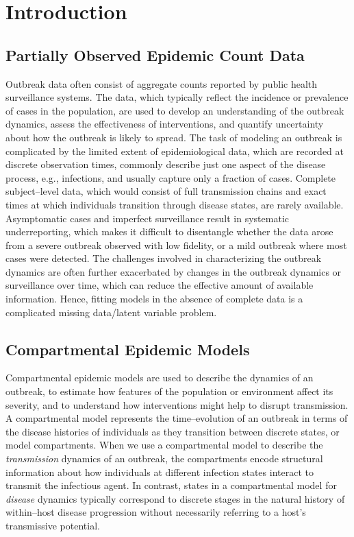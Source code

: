 \chapter{Introduction}
\label{chap:introduction}

\section{Partially Observed Epidemic Count Data}
\label{sec:data_background}

Outbreak data often consist of aggregate counts reported by public health surveillance systems. The data, which typically reflect the incidence or prevalence of cases in the population, are used to develop an understanding of the outbreak dynamics, assess the effectiveness of interventions, and quantify uncertainty about how the outbreak is likely to spread. 
The task of modeling an outbreak is complicated by the limited extent of epidemiological data, which are recorded at discrete observation times, commonly describe just one aspect of the disease process, e.g., infections, and usually capture only a fraction of cases. Complete subject--level data, which would consist of full transmission chains and exact times at which individuals transition through disease states, are rarely available. Asymptomatic cases and imperfect surveillance result in systematic underreporting, which makes it difficult to disentangle whether the data arose from a severe outbreak observed with low fidelity, or a mild outbreak where most cases were detected. The challenges involved in characterizing the outbreak dynamics are often further exacerbated by changes in the outbreak dynamics or surveillance over time, which can reduce the effective amount of available information. Hence, fitting models in the absence of complete data is a complicated missing data/latent variable problem. 

\section{Compartmental Epidemic Models}
\label{sec:outbreak_models}

Compartmental epidemic models are used to describe the dynamics of an outbreak, to estimate how features of the population or environment affect its severity, and to understand how interventions might help to disrupt transmission. A compartmental model represents the time--evolution of an outbreak in terms of the disease histories of individuals as they transition between discrete states, or model compartments. When we use a compartmental model to describe the \textit{transmission} dynamics of an outbreak, the compartments encode structural information about how individuals at different infection states interact to transmit the infectious agent. In contrast, states in a compartmental model for \textit{disease} dynamics typically correspond to discrete stages in the natural history of within--host disease progression without necessarily referring to a host's transmissive potential. 

